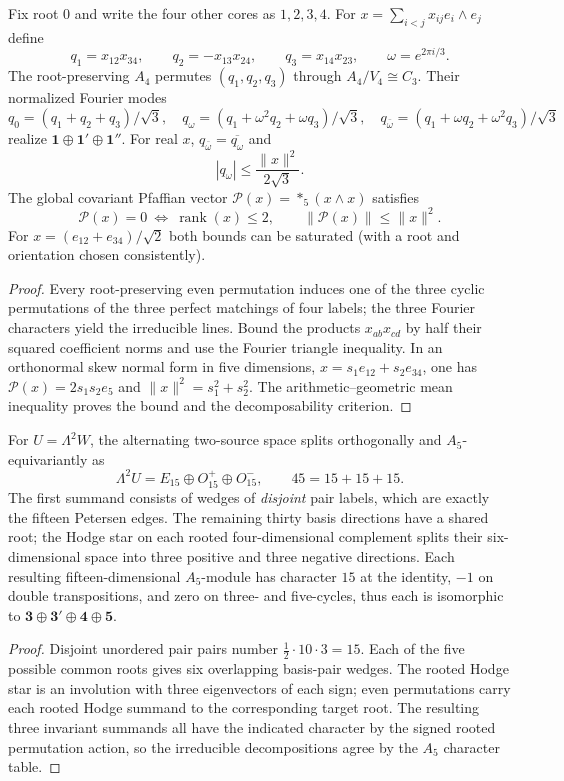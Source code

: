 \documentclass[12pt,a4paper]{article}
\begin{document}
\begin{theorem}
\label{p5:thm:v338-quadratic-cyclic-source}
Fix root $0$ and write the four other cores as $1,2,3,4$.
For $x=\sum_{i<j}x_{ij}e_i\wedge e_j$ define
\[
 q_1=x_{12}x_{34},\qquad q_2=-x_{13}x_{24},\qquad
 q_3=x_{14}x_{23},\qquad \omega=e^{2\pi i/3}.
\]
The root-preserving $A_4$ permutes $(q_1,q_2,q_3)$ through
$A_4/V_4\cong C_3$.  Their normalized Fourier modes
\[
 q_0=(q_1+q_2+q_3)/\sqrt3,\quad
 q_\omega=(q_1+\omega^2q_2+\omega q_3)/\sqrt3,\quad
 q_{\bar\omega}=(q_1+\omega q_2+\omega^2q_3)/\sqrt3
\]
realize $\mathbf1\oplus\mathbf1'\oplus\mathbf1''$.
For real $x$, $q_{\bar\omega}=\overline{q_\omega}$ and
\[
 |q_\omega|\leq\frac{\|x\|^2}{2\sqrt3}.
\]
The global covariant Pfaffian vector
$\mathcal P(x)=*_5(x\wedge x)$ satisfies
\[
 \mathcal P(x)=0\ \Longleftrightarrow\ \operatorname{rank}(x)\leq2,
 \qquad \|\mathcal P(x)\|\leq\|x\|^2.
\]
For $x=(e_{12}+e_{34})/\sqrt2$ both bounds can be saturated
(with a root and orientation chosen consistently).
\end{theorem}
\begin{proof}
Every root-preserving even permutation induces one of the three
cyclic permutations of the three perfect matchings of four labels;
the three Fourier characters yield the irreducible lines.  Bound
the products $x_{ab}x_{cd}$ by half their squared coefficient
norms and use the Fourier triangle inequality.  In an orthonormal
skew normal form in five dimensions,
$x=s_1e_{12}+s_2e_{34}$, one has
$\mathcal P(x)=2s_1s_2e_5$ and
$\|x\|^2=s_1^2+s_2^2$.  The arithmetic--geometric mean inequality
proves the bound and the decomposability criterion.
\end{proof}

\begin{theorem}
\label{p5:thm:v338-triple-clifford-edge-module}
For $U=\Lambda^2W$, the alternating two-source space splits
orthogonally and $A_5$-equivariantly as
\[
 \Lambda^2U=E_{15}\oplus O_{15}^+\oplus O_{15}^-,
 \qquad 45=15+15+15.
\]
The first summand consists of wedges of \emph{disjoint} pair labels,
which are exactly the fifteen Petersen edges.  The remaining thirty
basis directions have a shared root; the Hodge star on each rooted
four-dimensional complement splits their six-dimensional space into
three positive and three negative directions.  Each resulting
fifteen-dimensional $A_5$-module has character $15$ at the identity,
$-1$ on double transpositions, and zero on three- and five-cycles,
thus each is isomorphic to
$\mathbf3\oplus\mathbf3'\oplus\mathbf4\oplus\mathbf5$.
\end{theorem}
\begin{proof}
Disjoint unordered pair pairs number $\tfrac12\cdot10\cdot3=15$.
Each of the five possible common roots gives six overlapping
basis-pair wedges.  The rooted Hodge star is an involution with
three eigenvectors of each sign; even permutations carry each
rooted Hodge summand to the corresponding target root.  The resulting
three invariant summands all have the indicated character by the
signed rooted permutation action, so the irreducible decompositions
agree by the $A_5$ character table.
\end{proof}
\end{document}
